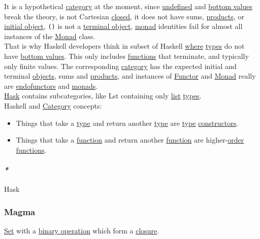 \documentclass[11pt]{article}
\begin{document}
It is a hypothetical \hyperref[org3e3a79b]{category} at the moment, since \hyperref[org264729a]{undefined} and \hyperref[org8c4647d]{bottom values} break the theory, is not Cartesian \hyperref[orgfa67abb]{closed}, it does not have sums, \hyperref[org17afff4]{products}, or \hyperref[org7d94b27]{initial object}, \texttt{()} is not a \hyperref[org05f2dea]{terminal object}, \hyperref[org268aaf1]{monad} identities fail for almost all instances of the \hyperref[org268aaf1]{Monad} class.\\

That is why Haskell developers think in subset of Haskell \hyperref[orgefd1ecd]{where} \hyperref[org3927fd9]{types} do not have \hyperref[org8c4647d]{bottom values}. This only includes \hyperref[org66c5288]{functions} that terminate, and typically only finite values. The corresponding \hyperref[org3e3a79b]{category} has the expected initial and terminal \hyperref[orge0f000f]{objects}, sums and \hyperref[org17afff4]{products}, and instances of \hyperref[org6073683]{Functor} and \hyperref[org268aaf1]{Monad} really are \hyperref[org1a8cedf]{endofunctors} and \hyperref[org3ecde32]{monads}.\\

\hyperref[org79be162]{Hask} contains subcategories, like Lst containing only \hyperref[org8ae0f28]{list} \hyperref[org3927fd9]{types}.\\

Haskell and \hyperref[org3e3a79b]{Category} concepts:\\
\begin{itemize}
\item Things that take a \hyperref[org4fbaeb8]{type} and return another \hyperref[org4fbaeb8]{type} are \hyperref[org4fbaeb8]{type} \hyperref[orgc5bd814]{constructors}.\\
\item Things that take a \hyperref[orgeb5cddb]{function} and return another \hyperref[orgeb5cddb]{function} are higher-\hyperref[org8544276]{order} \hyperref[org66c5288]{functions}.\\
\end{itemize}

\paragraph{\emph{*}}
\label{sec:org2e33889}

\label{org79be162}Hask\\

\subsubsection{\label{orgc56e426}Magma}
\label{sec:org47f7e89}
\hyperref[orgbed80ba]{Set} with a \hyperref[orgd89f717]{binary operation} which form a \hyperref[org953a876]{closure}.\\
\end{document}
